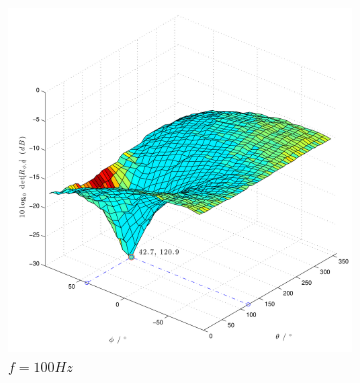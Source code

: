   
\begin{figure}
        \centering
        \begin{subfigure}[b]{0.48\textwidth}
                \centering
                \includegraphics[width=\textwidth]{images/02_Konzeptionierung/Sim_sine_f_100_Phi_45_Theta_120_dB_SNR_100dB}
                \caption{$f=100Hz$}
                \label{fig:Sim_sine_f_100_Phi_45_Theta_120_dB_SNR_100dB}
        \end{subfigure}
        ~ %
        \begin{subfigure}[b]{0.48\textwidth}
                \centering

\end{subfigure}
\end{figure}
